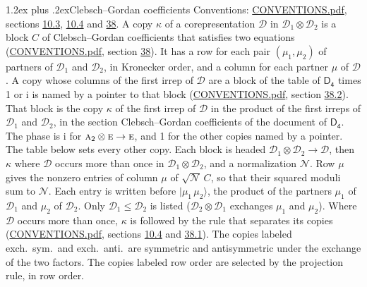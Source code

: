 \documentclass[10pt,a4paper]{article}
\makeatletter
\renewcommand\section{\@startsection{section}{1}{\z@}{-3ex plus -1ex minus -.2ex}%
  {1.2ex plus .2ex}{\normalfont\large\sffamily\bfseries\color{parttitle}}}
\numberwithin{equation}{section}
\newcommand{\grp}[1]{\mathsf{#1}}
\newcommand{\irr}[1]{\text{\normalfont\scshape #1}}
\newcommand{\iunit}{\mathrm{i}}
\newcommand{\irrprod}{\otimes}
\newcommand{\mult}{\kappa}
\newcommand{\intx}{\mu}
\newcommand{\cgnorm}{\mathcal{N}}
\newcommand{\prodket}[2]{\lvert {#1}\,{#2}\rangle}
\makeatother
\begin{document}
\section{Clebsch--Gordan coefficients}\label{s:clebsch_gordan}
Conventions: \href{../../CONVENTIONS.pdf}{CONVENTIONS.pdf}, sections \href{../../../rotation/CONVENTIONS.pdf\#conv.10.3}{10.3}, \href{../../../rotation/CONVENTIONS.pdf\#conv.10.4}{10.4} and \href{../../CONVENTIONS.pdf\#conv.38}{38}.
\leavevmode\label{n:index.copy}\label{n:matrix.cg.stored}A copy $\mult$ of a corepresentation $\mathcal{D}$ in $\mathcal{D}_1\irrprod\mathcal{D}_2$ is a block $C$ of Clebsch--Gordan coefficients that satisfies two equations (\href{../../CONVENTIONS.pdf}{CONVENTIONS.pdf}, section \href{../../CONVENTIONS.pdf\#conv.38}{38}). \label{n:index.cg}It has a row for each pair $(\intx_1, \intx_2)$ of partners of $\mathcal{D}_1$ and $\mathcal{D}_2$, in Kronecker order, and a column for each partner $\intx$ of $\mathcal{D}$.
A copy whose columns of the first irrep of $\mathcal{D}$ are a block of the table of $\grp{D_{4}}$ times 1 or $\iunit$ is named by a pointer to that block (\href{../../CONVENTIONS.pdf}{CONVENTIONS.pdf}, section \href{../../CONVENTIONS.pdf\#conv.38.2}{38.2}). That block is the copy $\mult$ of the first irrep of $\mathcal{D}$ in the product of the first irreps of $\mathcal{D}_1$ and $\mathcal{D}_2$, in the section Clebsch--Gordan coefficients of the document of \href{../../../rotation/data/pdf/D4.pdf}{$\grp{D_{4}}$}. The phase is $\iunit$ for $\irr{a}_{2}\irrprod \irr{e}\to \irr{e}$, and 1 for the other copies named by a pointer. The table below sets every other copy.
Each block is headed $\mathcal{D}_1\irrprod\mathcal{D}_2\to\mathcal{D}$, then $\mult$ where $\mathcal{D}$ occurs more than once in $\mathcal{D}_1\irrprod\mathcal{D}_2$, and a normalization $\cgnorm$. Row $\intx$ gives the nonzero entries of column $\intx$ of $\sqrt{\cgnorm}\,C$, so that their squared moduli sum to $\cgnorm$. \label{n:vector.ket.product}Each entry is written before $\prodket{\intx_1}{\intx_2}$, the product of the partners $\intx_1$ of $\mathcal{D}_1$ and $\intx_2$ of $\mathcal{D}_2$. Only $\mathcal{D}_1 \le \mathcal{D}_2$ is listed ($\mathcal{D}_2\irrprod\mathcal{D}_1$ exchanges $\intx_1$ and $\intx_2$).
Where $\mathcal{D}$ occurs more than once, $\mult$ is followed by the rule that separates its copies (\href{../../CONVENTIONS.pdf}{CONVENTIONS.pdf}, sections \href{../../../rotation/CONVENTIONS.pdf\#conv.10.4}{10.4} and \href{../../CONVENTIONS.pdf\#conv.38.1}{38.1}). \label{n:abbreviation.exchange}The copies labeled exch.\ sym.\ and exch.\ anti.\ are symmetric and antisymmetric under the exchange of the two factors. The copies labeled row order are selected by the projection rule, in row order.
\end{document}
